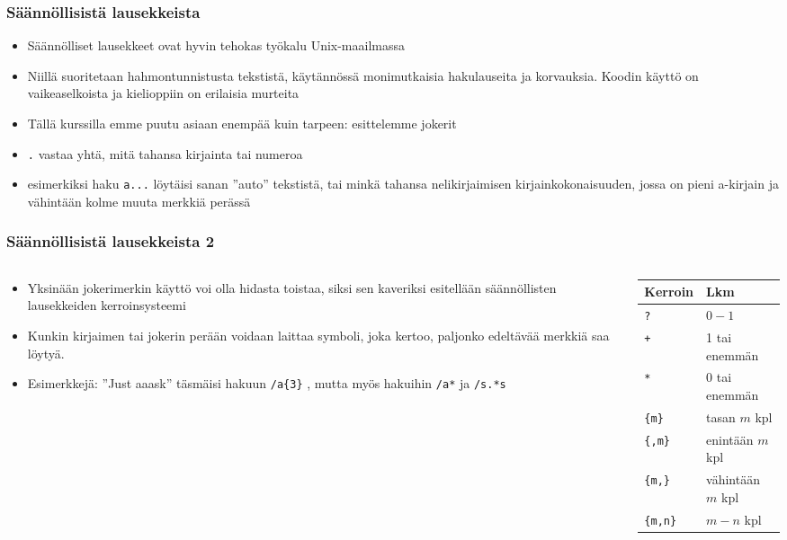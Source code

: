 \documentclass[]{beamer}
\newcommand{\Tohj}[1]{\texttt{#1}}
\newcommand{\com}[1]{{\color{blue!50!black}\Tohj{#1}} \!\!}
\newcommand{\code}[1]{\texttt{#1}}
\begin{document}
\begin{frame}
    \frametitle{Säännöllisistä lausekkeista}
    \begin{itemize}
        \item Säännölliset lausekkeet ovat hyvin tehokas työkalu Unix-maailmassa
        \item Niillä suoritetaan hahmontunnistusta tekstistä, käytännössä monimutkaisia hakulauseita ja korvauksia. Koodin käyttö on vaikeaselkoista ja kielioppiin on erilaisia murteita
        \pause
        \item Tällä kurssilla emme puutu asiaan enempää kuin tarpeen: esittelemme jokerit
        \item \code{.} vastaa yhtä, mitä tahansa kirjainta tai numeroa
        \item esimerkiksi haku \com{a...} löytäisi sanan ''auto'' tekstistä, tai minkä t{ahan}sa nelikirjaimisen kirjainkokonaisuuden, jossa on pieni a-kirjain ja vähintään kolme muuta merkkiä perässä
    \end{itemize}
\end{frame}

\begin{frame}
    \frametitle{Säännöllisistä lausekkeista 2}
    \begin{columns}
    \begin{column}{0.6\textwidth}
    \begin{itemize}
        \item Yksinään jokerimerkin käyttö voi olla hidasta toistaa, siksi sen kaveriksi esitellään säännöllisten lausekkeiden kerroinsysteemi
        \item Kunkin kirjaimen tai jokerin perään voidaan laittaa symboli, joka kertoo, paljonko edeltävää merkkiä saa löytyä.
        \item Esimerkkejä: ''{Ju{st {\color<2>{purple}aaa}s}k}'' täsmäisi hakuun \com{/a\{3\}}, mutta myös hakuihin \com{/a*} ja \com{/s.*s}
    \end{itemize}
    \end{column}
    \begin{column}{0.4\textwidth}
        \begin{tabular}{|ll|}
        \hline
        Kerroin & Lkm \\
        \hline \hline
        \code{?}        & $0-1$\\
        \code{+}        & 1 tai enemmän \\
        \code{*}        & 0 tai enemmän \\
        \code{\{m\}}    & tasan $m$ kpl \\
        \code{\{,m\}}   & enintään $m$ kpl \\
        \code{\{m,\}}   & vähintään $m$ kpl \\
        \code{\{m,n\}}  & $m-n$ kpl \\
        \hline
        \end{tabular}
    \end{column}
    \end{columns}
\end{frame}
\end{document}
